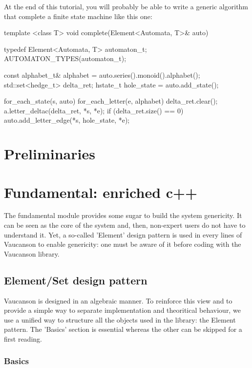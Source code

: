 \documentclass{article}
\begin{document}
At the end of this tutorial, you will probably be able to write a generic
algorithm that complete a finite state machine like this one:

\begin{code}
template <class T>
void complete(Element<Automata, T>& auto)
{
  typedef Element<Automata, T> automaton_t;
  AUTOMATON_TYPES(automaton_t);

  const alphabet_t& alphabet = auto.series().monoid().alphabet();
  std::set<hedge_t> delta_ret;
  hstate_t          hole_state = auto.add_state();

  for_each_state(s, auto)
    for_each_letter(e, alphabet)
    {
      delta_ret.clear();
      a.letter_deltac(delta_ret, *s, *e);
      if (delta_ret.size() == 0)
        auto.add_letter_edge(*s, hole_state, *e);
    }
}
\end{code}

\section{Preliminaries}


\section{Fundamental: enriched c++}

The fundamental module provides some sugar to build the system
genericity. It can be seen as the core of the system and, then,
non-expert users do not have to understand it. Yet, a so-called
'Element' design pattern is used in every lines of Vaucanson to enable
genericity: one must be aware of it before coding with the Vaucanson
library.

\subsection{Element/Set design pattern}

Vaucanson is designed in an algebraic
manner. To reinforce this view and to provide a simple way to separate
implementation and theoritical behaviour, we use a unified way to
structure all the objects used in the library: the Element pattern. The
'Basics' section is essential whereas the other can be skipped for a
first reading.

\subsubsection{Basics}
\end{document}
